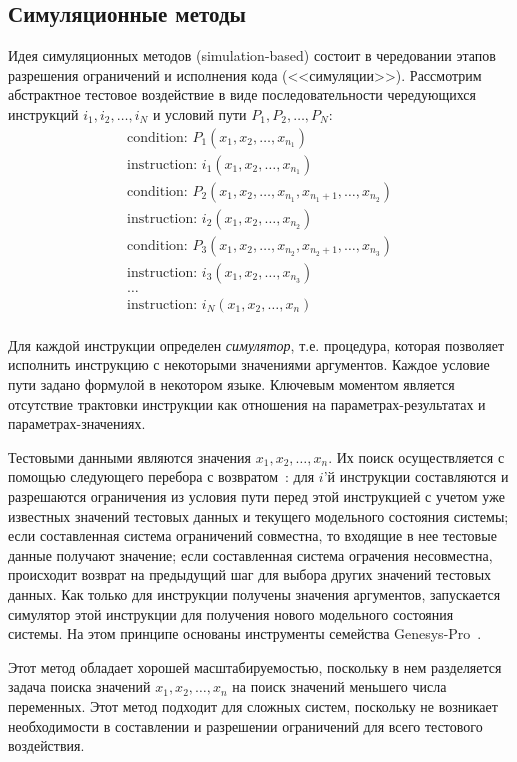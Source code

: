 \subsection{Симуляционные методы}
Идея симуляционных методов (simulation-based) состоит в чередовании
этапов разрешения ограничений и исполнения кода (<<симуляции>>).
Рассмотрим абстрактное тестовое воздействие в виде
последовательности чередующихся инструкций $i_1, i_2, \dots, i_N$ и
условий пути $P_1, P_2, \dots, P_N$:
$$
\begin{array}{l}
\mbox{condition: } P_1(x_1, x_2, \dots, x_{n_1})\\
\mbox{instruction: }i_1 (x_1, x_2, \dots, x_{n_1})\\
\mbox{condition: } P_2 (x_1, x_2, \dots, x_{n_1}, x_{n_1+1}, \dots, x_{n_2})\\
\mbox{instruction: }i_2 (x_1, x_2, \dots, x_{n_2})\\
\mbox{condition: } P_3(x_1, x_2, \dots, x_{n_2}, x_{n_2+1}, \dots, x_{n_3})\\
\mbox{instruction: }i_3 (x_1, x_2, \dots, x_{n_3})\\
\dots\\
\mbox{instruction: }i_N (x_1, x_2, \dots, x_n)\\
\end{array}
$$

Для каждой инструкции определен \emph{симулятор}, т.е. процедура,
которая позволяет исполнить инструкцию с некоторыми значениями
аргументов. Каждое условие пути задано формулой в некотором языке.
Ключевым моментом является отсутствие трактовки инструкции как
отношения на параметрах-результатах и параметрах-значениях.

Тестовыми данными являются значения $x_1, x_2, \dots, x_n$. Их поиск
осуществляется с помощью следующего перебора с
возвратом~\cite{GenesysPro}: для $i$'й инструкции составляются и
разрешаются ограничения из условия пути перед этой инструкцией с
учетом уже известных значений тестовых данных и текущего модельного
состояния системы; если составленная система ограничений совместна,
то входящие в нее тестовые данные получают значение; если
составленная система ограчения несовместна, происходит возврат на
предыдущий шаг для выбора других значений тестовых данных. Как
только для инструкции получены значения аргументов, запускается
симулятор этой инструкции для получения нового модельного состояния
системы. На этом принципе основаны инструменты семейства
Genesys-Pro~\cite{GenesysPro}.

Этот метод обладает хорошей масштабируемостью, поскольку в нем
разделяется задача поиска значений $x_1, x_2, \dots, x_n$ на поиск
значений меньшего числа переменных. Этот метод подходит для сложных
систем, поскольку не возникает необходимости в составлении и
разрешении ограничений для всего тестового воздействия.

